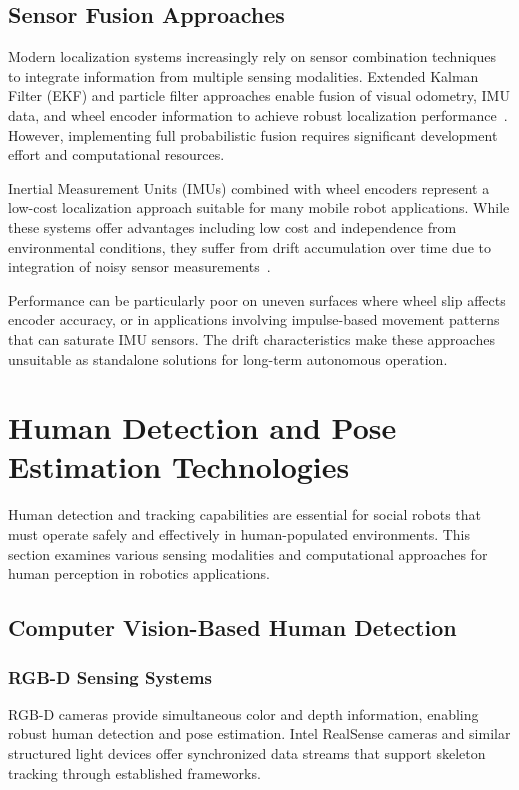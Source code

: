 \subsection{Sensor Fusion Approaches}
Modern localization systems increasingly rely on sensor combination techniques to integrate information from multiple sensing modalities. Extended Kalman Filter (EKF) and particle filter approaches enable fusion of visual odometry, IMU data, and wheel encoder information to achieve robust localization performance~\cite{huang2018sensor}. However, implementing full probabilistic fusion requires significant development effort and computational resources.

Inertial Measurement Units (IMUs) combined with wheel encoders represent a low-cost localization approach suitable for many mobile robot applications. While these systems offer advantages including low cost and independence from environmental conditions, they suffer from drift accumulation over time due to integration of noisy sensor measurements~\cite{borenstein1996measurement}.

Performance can be particularly poor on uneven surfaces where wheel slip affects encoder accuracy, or in applications involving impulse-based movement patterns that can saturate IMU sensors. The drift characteristics make these approaches unsuitable as standalone solutions for long-term autonomous operation.

\section{Human Detection and Pose Estimation Technologies}
Human detection and tracking capabilities are essential for social robots that must operate safely and effectively in human-populated environments. This section examines various sensing modalities and computational approaches for human perception in robotics applications.

\subsection{Computer Vision-Based Human Detection}
\subsubsection{RGB-D Sensing Systems}
RGB-D cameras provide simultaneous color and depth information, enabling robust human detection and pose estimation. Intel RealSense cameras and similar structured light devices offer synchronized data streams that support skeleton tracking through established frameworks.

